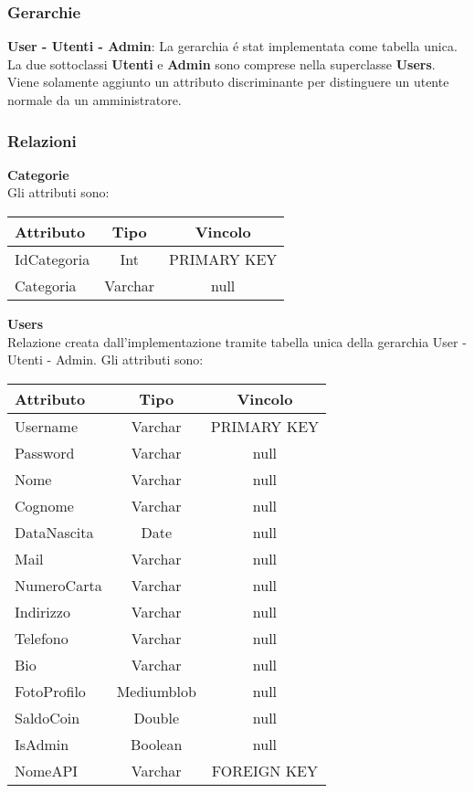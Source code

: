 {{		\subsubsection{Gerarchie}
		\textbf{User - Utenti - Admin}: La gerarchia é stat implementata come tabella unica. La due sottoclassi \textbf{Utenti} e \textbf{Admin} sono comprese nella superclasse \textbf{Users}. Viene solamente aggiunto un attributo discriminante per distinguere un utente normale da un amministratore.\\
		\subsubsection{Relazioni}
		\textbf{Categorie}\\
		Gli attributi sono: \\
			\begin{center}
			\begin{tabular}{lcc}
				\textbf{Attributo}&\textbf{Tipo}&\textbf{Vincolo}\\ \hline
				IdCategoria&Int&PRIMARY KEY\\
				Categoria&Varchar&null \\
			\end{tabular}
			\end{center}
			
		\textbf{Users}\\
			Relazione creata dall'implementazione tramite tabella unica della gerarchia User - Utenti - Admin. Gli attributi sono:
			\begin{center}
			\begin{tabular}{lcc}
				\textbf{Attributo}&\textbf{Tipo}&\textbf{Vincolo}\\ \hline
				Username&Varchar&PRIMARY KEY\\
				Password&Varchar&null \\				
				Nome&Varchar&null \\
				Cognome&Varchar&null \\
				DataNascita&Date&null \\				
				Mail&Varchar&null \\
				NumeroCarta&Varchar&null \\
				Indirizzo&Varchar&null \\
				Telefono&Varchar&null \\
				Bio&Varchar&null \\
				FotoProfilo&Mediumblob&null\\
				SaldoCoin&Double&null \\
				IsAdmin&Boolean&null \\
				NomeAPI&Varchar&FOREIGN KEY\\
			\end{tabular}
			\end{center}				
			
}}
